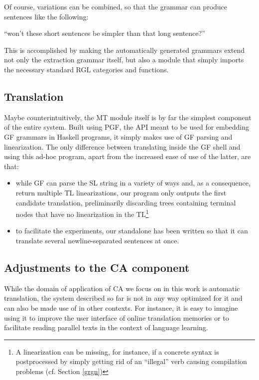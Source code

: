 Of course, variations can be combined, so that the grammar can produce sentences like the following:

\begin{example}
    ``won't these short sentences be simpler than that long sentence?''
\end{example}

This is accomplished by making the automatically generated grammars extend not only the extraction grammar itself, but also a module that simply imports the necessary standard RGL categories and functions.

\subsection{Translation} \label{mt}
Maybe counterintuitively, the MT module itself is by far the simplest component of the entire system. 
Built using PGF, the API meant to be used for embedding GF grammars in Haskell programs, it simply makes use of GF parsing and linearization.
The only difference between translating inside the GF shell and using this ad-hoc program, apart from the increased ease of use of the latter, are that: \smallskip

\begin{itemize}
    \item while GF can parse the SL string in a variety of ways and, as a consequence, return multiple TL linearizations, our program only outputs the first candidate translation, preliminarily discarding trees containing terminal nodes that have no linearization in the TL\footnote{A linearization can be missing, for instance, if a concrete syntax is postprocessed by simply getting rid of an ``illegal'' verb causing compilation problems (cf. Section \ref{grgn})} 
    \item to facilitate the experiments, our standalone has been written so that it can translate several newline-separated sentences at once.
\end{itemize}

\subsection{Adjustments to the CA component} \label{tuning}

While the domain of application of CA we focus on in this work is automatic translation, the system described so far is not in any way optimized for it and can also be made use of in other contexts. 
For instance, it is easy to imagine using it to improve the user interface of online translation memories or to facilitate reading parallel texts in the context of language learning. \smallskip

